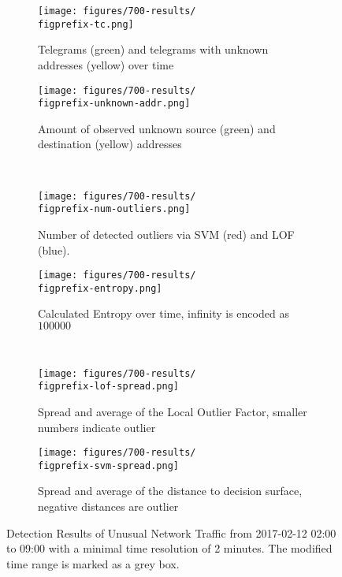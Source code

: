 \begin{figure}[H]
	\newcommand{\figwith}{0.49\textwidth}
	\newcommand{\figprefix}{unusual}
	\centering
	
	\begin{subfigure}[b]{\figwith}
		\texttt{[image: figures/700-results/\\figprefix-tc.png]}
		\caption{Telegrams (green) and telegrams with unknown addresses (yellow) over time}
		\label{fig:results:\figprefix:tc}
	\end{subfigure}
	\hfil
	\begin{subfigure}[b]{\figwith}
		\texttt{[image: figures/700-results/\\figprefix-unknown-addr.png]}
		\caption{Amount of observed unknown source (green) and destination (yellow) addresses}
		\label{fig:results:\figprefix:addr}
	\end{subfigure}
	\\[1.5mm]
	\begin{subfigure}[b]{\figwith}
		\texttt{[image: figures/700-results/\\figprefix-num-outliers.png]}
		\caption{Number of detected outliers via SVM (red) and LOF (blue).}
		\label{fig:results:\figprefix:outlier}
	\end{subfigure}
	\hfil
	\begin{subfigure}[b]{\figwith}
		\texttt{[image: figures/700-results/\\figprefix-entropy.png]}
		\caption{Calculated Entropy over time, infinity is encoded as $100 000$}
		\label{fig:results:\figprefix:entropy}
	\end{subfigure}
	\\[1.5mm]
	\begin{subfigure}[b]{\figwith}
		\texttt{[image: figures/700-results/\\figprefix-lof-spread.png]}
		\caption{Spread and average of the Local Outlier Factor, smaller numbers indicate outlier}
		\label{fig:results:\figprefix:lof}
	\end{subfigure}
	\hfil
	\begin{subfigure}[b]{\figwith}
		\texttt{[image: figures/700-results/\\figprefix-svm-spread.png]}
		\caption{Spread and average of the distance to decision surface, negative distances are outlier}
		\label{fig:results:\figprefix:svm}
	\end{subfigure}
	
	\caption[Detection Results of Unusual Network Traffic]{Detection Results of Unusual Network Traffic from 2017-02-12 02:00 to 09:00 with a minimal time resolution of 2 minutes. The modified time range is marked as a grey box.}
	\label{fig:results:\figprefix}
	
\end{figure}


